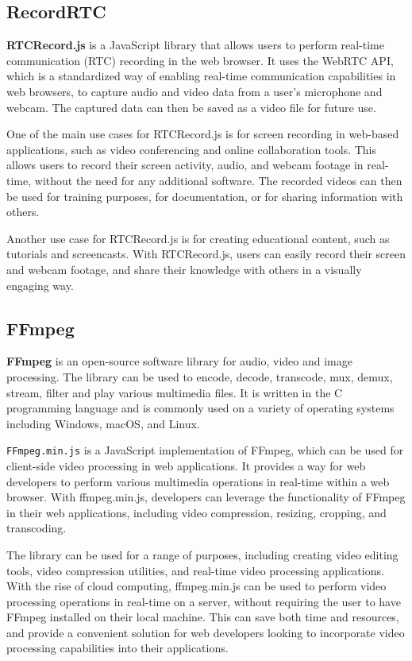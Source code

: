 \subsection{RecordRTC}
\textbf{RTCRecord.js} is a JavaScript library that allows users to perform real-time communication (RTC) 
recording in the web browser. It uses the WebRTC API, which is a standardized way of enabling 
real-time communication capabilities in web browsers, to capture audio and video data from a 
user's microphone and webcam. The captured data can then be saved as a video file for future use.

One of the main use cases for RTCRecord.js is for screen recording in web-based applications, 
such as video conferencing and online collaboration tools. This allows users to record their 
screen activity, audio, and webcam footage in real-time, without the need for any additional 
software. The recorded videos can then be used for training purposes, for documentation, 
or for sharing information with others.

Another use case for RTCRecord.js is for creating educational content, such as tutorials 
and screencasts. With RTCRecord.js, users can easily record their screen and webcam footage, 
and share their knowledge with others in a visually engaging way. \cite{rtcrecord}

\subsection{FFmpeg}
\textbf{FFmpeg} is an open-source software library for audio, video and image processing. 
The library can be used to encode, decode, transcode, mux, demux, stream, filter and play various 
multimedia files. It is written in the C programming language and is commonly used on a variety of 
operating systems including Windows, macOS, and Linux.

\texttt{FFmpeg.min.js} is a JavaScript implementation of FFmpeg, which can be used for client-side video 
processing in web applications. It provides a way for web developers to perform various multimedia 
operations in real-time within a web browser. With ffmpeg.min.js, developers can leverage the 
functionality of FFmpeg in their web applications, including video compression, resizing, cropping, and transcoding.

The library can be used for a range of purposes, including creating video editing tools, video 
compression utilities, and real-time video processing applications. With the rise of cloud computing, 
ffmpeg.min.js can be used to perform video processing operations in real-time on a server, without requiring 
the user to have FFmpeg installed on their local machine. This can save both time and resources, and provide 
a convenient solution for web developers looking to incorporate video processing capabilities into their applications. \cite{ffmpeg}

